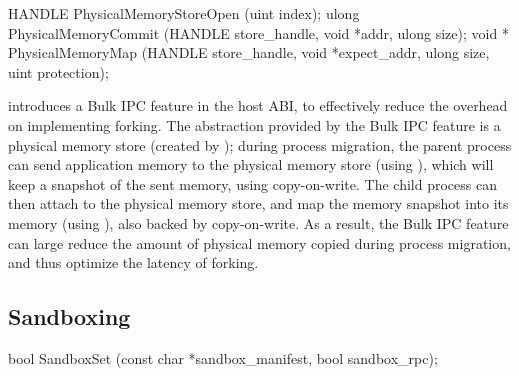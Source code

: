 \begin{paldef}
HANDLE PhysicalMemoryStoreOpen (uint index);
ulong  PhysicalMemoryCommit (HANDLE store_handle,
                            void *addr, ulong size);
void * PhysicalMemoryMap (HANDLE store_handle,
                          void *expect_addr, ulong size,
                          uint protection);
\end{paldef}


\graphene{} introduces a Bulk IPC feature in the host ABI, to effectively reduce the overhead on implementing forking.
The abstraction provided by the Bulk IPC feature
is a physical memory store (created by );
during process migration, the parent process
can send application memory to the physical memory store (using ), which will keep a snapshot of the sent memory, using copy-on-write.
The child process can then attach to the physical memory store,
and map the memory snapshot into its memory (using ), also backed by copy-on-write.
As a result, the Bulk IPC feature can large reduce the amount of physical memory copied during process migration,
and thus optimize the latency of forking.




\subsection*{Sandboxing}


\begin{paldef}
bool SandboxSet (const char *sandbox_manifest,
                 bool sandbox_rpc);
\end{paldef}